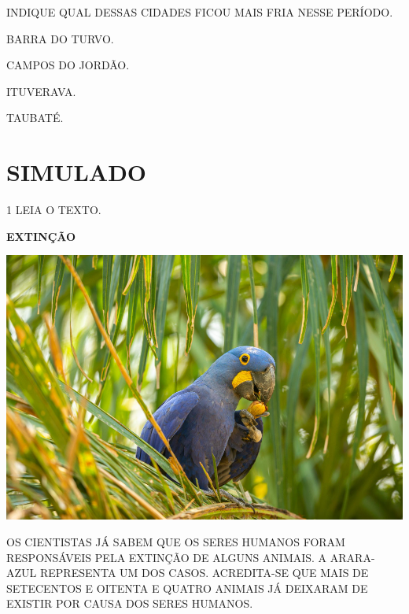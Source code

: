 INDIQUE QUAL DESSAS CIDADES FICOU MAIS FRIA NESSE PERÍODO.
\enlargethispage{2\baselineskip}

\begin{multicols}{2}
\begin{escolha}
\item BARRA DO TURVO.

\item CAMPOS DO JORDÃO.

\item ITUVERAVA.

\item TAUBATÉ.
\end{escolha}
\end{multicols}



\chapter[SIMULADO 2]{SIMULADO}

\num{1} LEIA O TEXTO.

\begin{myquote}
\textbf{EXTINÇÃO}

\medskip

\begin{center}
\includegraphics[width=.9\textwidth]{media/image118.png}
\end{center}

\medskip

OS CIENTISTAS JÁ SABEM QUE OS SERES HUMANOS FORAM RESPONSÁVEIS PELA EXTINÇÃO DE ALGUNS ANIMAIS. A ARARA-AZUL REPRESENTA UM DOS CASOS. ACREDITA-SE QUE MAIS DE SETECENTOS E OITENTA E QUATRO ANIMAIS JÁ
DEIXARAM DE EXISTIR POR CAUSA DOS SERES HUMANOS.
\end{myquote}

